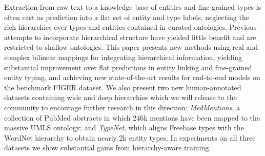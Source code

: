 Extraction from raw text to a knowledge base of entities and fine-grained types is often cast as prediction into a flat set of entity and type labels, neglecting the rich hierarchies over types and entities contained in curated ontologies. Previous attempts to incorporate hierarchical structure have yielded little benefit and are restricted to shallow ontologies. This paper presents new methods using real and complex bilinear mappings for integrating hierarchical information, yielding substantial improvement over flat predictions in entity linking and fine-grained entity typing, and achieving new state-of-the-art results for end-to-end models on the benchmark FIGER dataset. We also present two new human-annotated datasets containing wide and deep hierarchies which we will release to the community to encourage further research in this direction: \emph{MedMentions}, a collection of PubMed abstracts in which 246k mentions have been mapped to the massive UMLS ontology; and \emph{TypeNet}, which aligns Freebase types with the WordNet hierarchy to obtain nearly 2k entity types. In experiments on all three datasets we show substantial gains from hierarchy-aware training.
